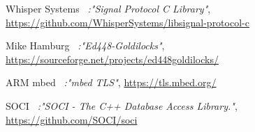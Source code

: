 \documentclass[a4paper,11pt]{article}
\begin{document}
\begin{thebibliography}{99}
  Whisper Systems
  \textit{\ :"Signal Protocol C Library"},
  \href{https://github.com/WhisperSystems/libsignal-protocol-c}{https://github.com/WhisperSystems/libsignal-protocol-c}

  Mike Hamburg
  \textit{\ :"Ed448-Goldilocks"},
  \href{https://sourceforge.net/projects/ed448goldilocks/}{https://sourceforge.net/projects/ed448goldilocks/}
  
  ARM mbed
  \textit{\ :"mbed TLS"},
  \href{https://tls.mbed.org/}{https://tls.mbed.org/}
  
  SOCI
  \textit{\ :"SOCI - The C++ Database Access Library."},
  \href{https://github.com/SOCI/soci}{https://github.com/SOCI/soci}
\end{thebibliography}
\end{document}
